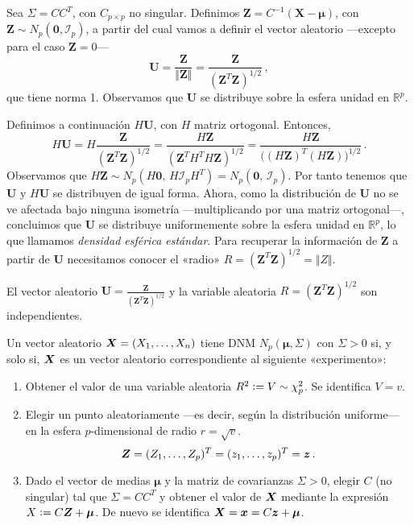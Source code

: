 Sea $\Sigma = CC^T$, con $C_{p\times p}$ no singular. Definimos $\boldsymbol Z = C^{-1}(\boldsymbol X - \boldsymbol \mu)$, con $\boldsymbol Z \sim N_p(\boldsymbol 0, \mathcal I_p)$, a partir del cual vamos a definir el vector aleatorio —excepto para el caso $\boldsymbol Z = 0$— \[\boldsymbol U = \frac{\boldsymbol Z}{\Vert \boldsymbol Z \Vert} = \frac{\boldsymbol Z}{(\boldsymbol Z^T \boldsymbol Z)^{1/2}}\,,\] que tiene norma 1. Observamos que $\boldsymbol U$ se distribuye sobre la esfera unidad en $\mathbb R^p$.

Definimos a continuación $H \boldsymbol U$, con $H$ matriz ortogonal. Entonces, \[
  H \boldsymbol U = H \frac{\boldsymbol Z}{\left(\boldsymbol Z^T \boldsymbol Z\right)^{1/2}} = \frac{H\boldsymbol Z}{\left(\boldsymbol Z^T H^T H\boldsymbol Z\right)^{1/2}} = \frac{H\boldsymbol Z}{\Big((H\boldsymbol Z)^T (H\boldsymbol Z)\Big)^{1/2}}\,.
\] Observamos que $H \boldsymbol Z \sim N_p(H \boldsymbol 0,\, H \mathcal I_pH^T) = N_p(\boldsymbol 0,\, \mathcal I_p)$. Por tanto tenemos que $\boldsymbol U$ y $H \boldsymbol U$ se distribuyen de igual forma. Ahora, como la distribución de $\boldsymbol U$ no se ve afectada bajo ninguna isometría —multiplicando por una matriz ortogonal—, concluimos que $\boldsymbol U$ se distribuye uniformemente sobre la esfera unidad en $\mathbb R^p$, lo que llamamos \textit{densidad esférica estándar}. Para recuperar la información de $\boldsymbol Z$ a partir de $\boldsymbol U$ necesitamos conocer el «radio» $R = (\boldsymbol Z^T \boldsymbol Z)^{1/2} = \Vert Z \Vert$.

\begin{nprop}
  El vector aleatorio $\boldsymbol U = \frac{\boldsymbol Z}{(\boldsymbol Z^T \boldsymbol Z)^{1/2}}$ y la variable aleatoria $R = (\boldsymbol Z^T \boldsymbol Z)^{1/2}$ son independientes.
\end{nprop}


\begin{nprop}
  Un vector aleatorio $\boldsymbol{X} = (X_1, \dots, X_n)$ tiene DNM $N_p(\boldsymbol \mu, \Sigma)$ con $\Sigma > 0$ si, y solo si, $\boldsymbol{X}$ es un vector aleatorio correspondiente al siguiente «experimento»:

  \begin{enumerate}
    \item Obtener el valor de una variable aleatoria $R^2 \vcentcolon= V \sim \chi_p^2$. Se identifica $V = v$.
    \item Elegir un punto aleatoriamente —es decir, según la distribución uniforme— en la esfera $p$-dimensional de radio $r = \sqrt{v}$. \[\boldsymbol{Z} = (Z_1, \dots, Z_p)^T = (z_1, \dots, z_p)^T = \boldsymbol z\,.\]
    \item Dado el vector de medias $\boldsymbol \mu$ y la matriz de covarianzas $\Sigma > 0$, elegir $C$ (no singular) tal que $\Sigma = CC^T$ y obtener el valor de $\boldsymbol{X}$ mediante la expresión $X\vcentcolon= C\boldsymbol{Z} + \boldsymbol \mu$. De nuevo se identifica $\boldsymbol{X} = \boldsymbol x = C\boldsymbol z + \boldsymbol \mu$.
  \end{enumerate}
\end{nprop}

